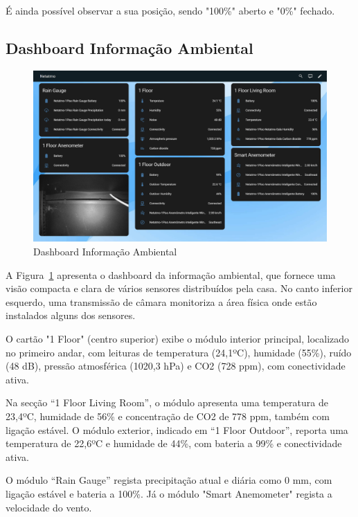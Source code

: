 É ainda possível observar a sua posição, sendo "100\%" aberto e "0\%" fechado.

\newpage


\subsection{Dashboard Informação Ambiental}

\begin{figure}[H]
    \centering
    \includegraphics[width=\textwidth]{images/netatmo.png}
    \caption{Dashboard Informação Ambiental}
    \label{fig: netatmo.png}
\end{figure}

A Figura~\ref{fig: netatmo.png} apresenta o dashboard da informação ambiental, que fornece uma visão compacta e clara de vários sensores distribuídos pela casa. No canto inferior esquerdo, uma transmissão de câmara monitoriza a área física onde estão instalados alguns dos sensores.

O cartão \textnormal"1 Floor" (centro superior) exibe o módulo interior principal, localizado no primeiro andar, com leituras de temperatura (24,1ºC), humidade (55\%), ruído (48 dB), pressão atmosférica (1020,3 hPa) e CO2 (728 ppm), com conectividade ativa.

Na secção “1 Floor Living Room”, o módulo apresenta uma temperatura de 23,4ºC, humidade de 56\% e concentração de CO2 de 778 ppm, também com ligação estável. O módulo exterior, indicado em “1 Floor Outdoor”, reporta uma temperatura de 22,6ºC e humidade de 44\%, com bateria a 99\% e conectividade ativa.

O módulo “Rain Gauge” regista precipitação atual e diária como 0 mm, com ligação estável e bateria a 100\%. Já o módulo "Smart Anemometer" regista a velocidade do vento.

